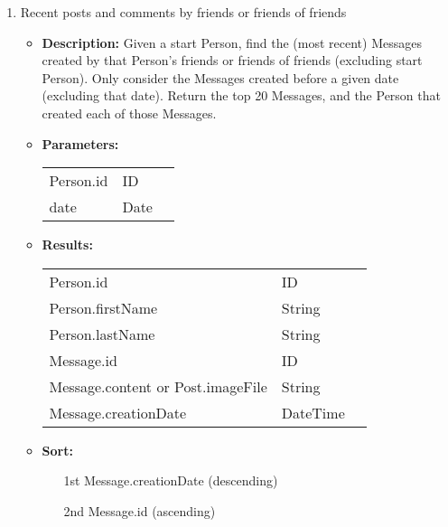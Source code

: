 {\begin{enumerate}
    \item Recent posts and comments by friends or friends of friends
        \begin{itemize}
            \item \textbf{Description:}
              Given a start Person, find the (most recent) Messages created
                by that Person's friends or friends of friends (excluding start
                Person). Only consider the Messages created before a given
                date (excluding that date). Return the top 20 Messages, and
                the Person that created each of those Messages. 
            \item \textbf{Parameters:} \\
                \begin{tabular}{lll}
                    Person.id 	 						& ID & \parbox[t]{20cm}{\par \strut} \\
                    date 		 						& Date & \parbox[t]{20cm}{\par \strut} \\
                \end{tabular}		
            \item \textbf{Results:} \\
                \begin{tabular}{lll}
                    Person.id 	 								& ID & \parbox[t]{20cm}{\par \strut} \\
                    Person.firstName 	 						& String & \parbox[t]{20cm}{\par \strut} \\
                    Person.lastName 	 						& String & \parbox[t]{20cm}{\par \strut} \\
                    Message.id  	 						& ID & \parbox[t]{20cm}{\par \strut} \\
                    Message.content or Post.imageFile	& String & \parbox[t]{20cm}{\par \strut} \\
                    Message.creationDate 	 	& DateTime & \parbox[t]{20cm}{\par \strut} \\
                \end{tabular}		
             \item \textbf{Sort:}
                  \begin{itemize}
                    \item[1st] Message.creationDate (descending)
                    \item[2nd] Message.id (ascending)
                  \end{itemize}
        \end{itemize}


\end{enumerate}}
